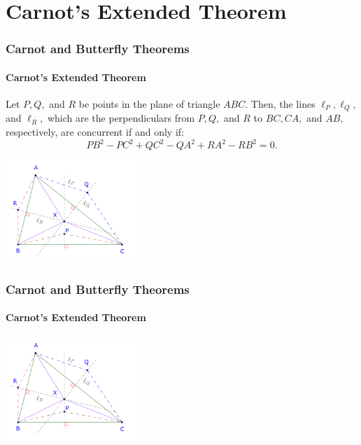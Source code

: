 \documentclass[8pt,xcolor=table,dvipsnames]{beamer}
\begin{document}
\section{Carnot's Extended Theorem}

\begin{frame}[t]
    \frametitle{Carnot and Butterfly Theorems}
    \framesubtitle{Carnot's Extended Theorem}
    \begin{theorem}
        Let $P, Q,$ and $R$ be points in the plane of triangle $ABC.$
        Then, the lines $\ell_P, \ell_Q,$ and $\ell_R,$
        which are the perpendiculars from $P, Q,$ and $R$ to $BC, CA,$ and $AB,$ respectively,
        are concurrent if and only if:
        \[
            PB^2 - PC^2 + QC^2 - QA^2 + RA^2 - RB^2 = 0.
        \]
    \end{theorem}
    \begin{center}
        \includegraphics[width=5cm]{./svg/pdf/24-25-s7-g3-p1.pdf}
    \end{center}
\end{frame}

\begin{frame}[t]
    \frametitle{Carnot and Butterfly Theorems}
    \framesubtitle{Carnot's Extended Theorem}
    \begin{center}
        \includegraphics[width=5cm]{./svg/pdf/24-25-s7-g3-p1.pdf}
    \end{center}

\end{frame}
\end{document}
